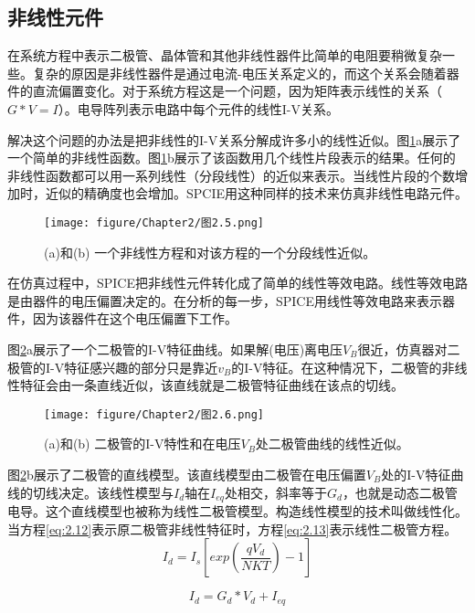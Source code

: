 \subsection{非线性元件}
在系统方程中表示二极管、晶体管和其他非线性器件比简单的电阻要稍微复杂一些。复杂的原因是非线性器件是通过电流-电压关系定义的，而这个关系会随着器件的直流偏置变化。对于系统方程这是一个问题，因为矩阵表示线性的关系（$G*V=I$）。电导阵列表示电路中每个元件的线性I-V关系。

解决这个问题的办法是把非线性的I-V关系分解成许多小的线性近似。图\ref{图2.5}a展示了一个简单的非线性函数。图\ref{图2.5}b展示了该函数用几个线性片段表示的结果。任何的非线性函数都可以用一系列线性（分段线性）的近似来表示。当线性片段的个数增加时，近似的精确度也会增加。SPCIE用这种同样的技术来仿真非线性电路元件。
\begin{figure}[htbp]
\small
    \centering
    \texttt{[image: figure/Chapter2/图2.5.png]}
    \caption{(a)和(b) 一个非线性方程和对该方程的一个分段线性近似。}
    \label{图2.5}
\end{figure}

在仿真过程中，SPICE把非线性元件转化成了简单的线性等效电路。线性等效电路是由器件的电压偏置决定的。在分析的每一步，SPICE用线性等效电路来表示器件，因为该器件在这个电压偏置下工作。

图\ref{图2.6}a展示了一个二极管的I-V特征曲线。如果解(电压)离电压$V_B$很近，仿真器对二极管的I-V特征感兴趣的部分只是靠近$v_B$的I-V特征。在这种情况下，二极管的非线性特征会由一条直线近似，该直线就是二极管特征曲线在该点的切线。
\begin{figure}[htbp]
\small
    \centering
    \texttt{[image: figure/Chapter2/图2.6.png]}
    \caption{(a)和(b) 二极管的I-V特性和在电压$V_B$处二极管曲线的线性近似。}
    \label{图2.6}
\end{figure}

图\ref{图2.6}b展示了二极管的直线模型。该直线模型由二极管在电压偏置$V_B$处的I-V特征曲线的切线决定。该线性模型与$I_d$轴在$I_{eq}$处相交，斜率等于$G_d$，也就是动态二极管电导。这个直线模型也被称为线性二极管模型。构造线性模型的技术叫做线性化。当方程\ref{eq:2.12}表示原二极管非线性特征时，方程\ref{eq:2.13}表示线性二极管方程。
\begin{equation}
    I_d = I_s[exp(\frac{qV_d}{NKT})-1]
    \label{eq:2.12}
\end{equation}

\begin{equation}
    I_d = G_d * V_d + I_{eq}
    \label{eq:2.13}
\end{equation}

